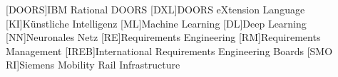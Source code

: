 
\begin{acronym}
	[DOORS]{IBM Rational DOORS}
	[DXL]{DOORS eXtension Language}
	[KI]{Künstliche Intelligenz}
	[ML]{Machine Learning}
	[DL]{Deep Learning}
	[NN]{Neuronales Netz}
	[RE]{Requirements Engineering}
	[RM]{Requirements Management}
	[IREB]{International Requirements Engineering Boards}
	[SMO RI]{Siemens Mobility Rail Infrastructure}
\end{acronym}


